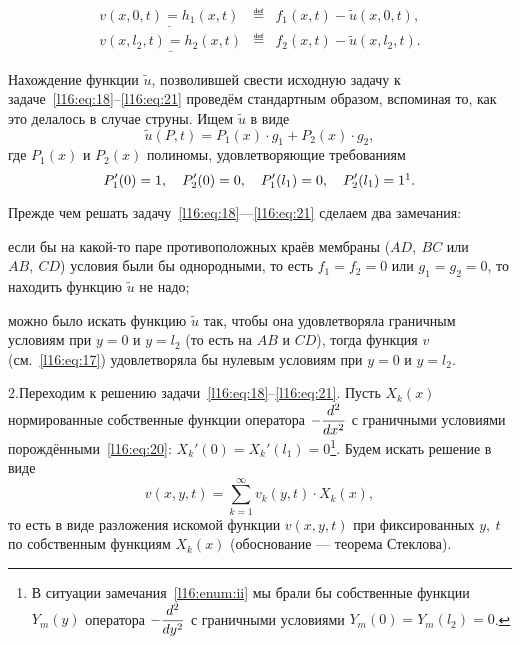 \begin{equation}\label{l16:eq:21}
	\begin{array}{rcl}
		\underline{v(x,0,t)=h_1(x,t)}&\eqdef&f_1(x,t)-\widetilde{u}(x,0,t),\\
		\underline{v(x,l_2,t)=h_2(x,t)}&\eqdef&f_2(x,t)-\widetilde{u}(x,l_2,t).
	\end{array} 
\end{equation}

Нахождение функции $\widetilde{u}$, позволившей свести исходную задачу к задаче~\eqref{l16:eq:18}--\eqref{l16:eq:21} проведём стандартным образом, вспоминая то, как это делалось в случае струны. Ищем $\widetilde{u}$ в виде
\begin{equation*}
	\widetilde{u}(P,t)=P_1(x)\cdot g_1+P_2(x)\cdot g_2,
\end{equation*}
где $P_1(x)$ и $P_2(x)$ полиномы, удовлетворяющие требованиям 
\begin{equation*}
	 P'_1(0)=1,\quad P'_2(0)=0,\quad P'_1(l_1)=0,\quad P'_2(l_1)=1\footnotemark{}.
\end{equation*}%
\vfill
\newpage

\noindent Прежде чем решать задачу~\eqref{l16:eq:18}---\eqref{l16:eq:21} сделаем два замечания:
\begin{enumeraterm}
	\item если бы на какой-то паре противоположных краёв мембраны ($AD,\ BC$ или $AB,\ CD$) условия были бы однородными, то есть $f_1=f_2=0$ или $g_1=g_2=0$, то находить функцию $\widetilde{u}$ не надо;
	\item\label{l16:enum:ii} можно было искать функцию $\widetilde{u}$ так, чтобы она удовлетворяла граничным условиям при $y=0$ и $y=l_2$ (то есть на $AB$ и $CD$), тогда функция $v$ (см.~\eqref{l16:eq:17}) удовлетворяла бы нулевым условиям при $y=0$ и $y=l_2$.
\end{enumeraterm}
2.\quad Переходим к решению задачи~\eqref{l16:eq:18}--\eqref{l16:eq:21}. Пусть $X_k(x)$ нормированные собственные функции оператора $\displaystyle-\frac{d^2}{dx^2}$ с граничными условиями порождёнными~\eqref{l16:eq:20}: $X_k'(0)=X_k'(l_1)=0$\footnote{В ситуации замечания~\ref{l16:enum:ii} мы брали бы собственные функции $Y_m(y)$ оператора $-\displaystyle\frac{d^2}{dy^2}$ с граничными условиями $Y_m(0)=Y_m(l_2)=0$.}. Будем искать решение в виде 
\begin{equation}\label{l16:eq:22}
	 v(x,y,t)=\sum\limits_{k=1}^{\infty}v_k(y,t)\cdot X_k(x),
\end{equation}
то есть в виде разложения искомой функции $v(x,y,t)$ при фиксированных $y,\ t$ по собственным функциям $X_k(x)$ (обоснование --- теорема Стеклова).

